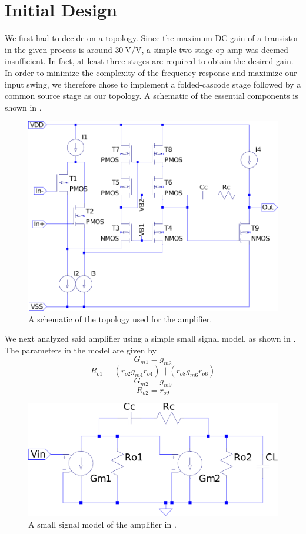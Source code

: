 \documentclass[journal,hidelinks]{IEEEtran}
\begin{document}
\section{Initial Design}

We first had to decide on a topology. Since the maximum DC gain of a transistor in the given process is around $\SI{30}{\volt\per\volt}$, a simple two-stage op-amp was deemed insufficient. In fact, at least three stages are required to obtain the desired gain. In order to minimize the complexity of the frequency response and maximize our input swing, we therefore chose to implement a folded-cascode stage followed by a common source stage as our topology. A schematic of the essential components is shown in .

\begin{figure}[!htb]
  \centering
  \includegraphics[width=\columnwidth]{schematics/topology.pdf}
  \caption{A schematic of the topology used for the amplifier.}
  \label{fig:topology}
\end{figure}

We next analyzed said amplifier using a simple small signal model, as shown in . The parameters in the model are given by
\[ G_{m1} = g_{m2} \]
\[ R_{o1} = (r_{o2} g_{m4} r_{o4}) \parallel (r_{o8} g_{m6} r_{o6}) \]
\[ G_{m2} = g_{m9} \]
\[ R_{o2} = r_{o9} \]

\begin{figure}[!htb]
  \centering
  \includegraphics[width=\columnwidth]{schematics/small-signal.pdf}
  \caption{A small signal model of the amplifier in .}
  \label{fig:small-signal}
\end{figure}
\end{document}
